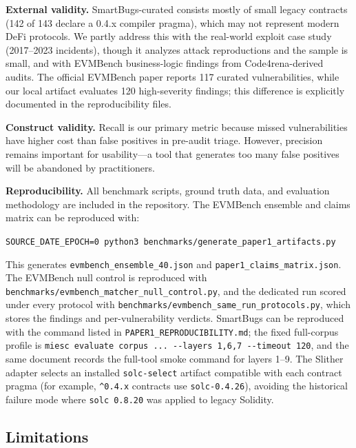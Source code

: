 \documentclass[conference]{IEEEtran}
\begin{document}
\textbf{External validity.} SmartBugs-curated consists mostly of small legacy contracts (142 of 143 declare a 0.4.x compiler pragma), which may not represent modern DeFi protocols. We partly address this with the real-world exploit case study (2017--2023 incidents), though it analyzes attack reproductions and the sample is small, and with EVMBench business-logic findings from Code4rena-derived audits. The official EVMBench paper reports 117 curated vulnerabilities, while our local artifact evaluates 120 high-severity findings; this difference is explicitly documented in the reproducibility files.

\textbf{Construct validity.} Recall is our primary metric because missed vulnerabilities have higher cost than false positives in pre-audit triage. However, precision remains important for usability---a tool that generates too many false positives will be abandoned by practitioners.

\textbf{Reproducibility.} All benchmark scripts, ground truth data, and evaluation methodology are included in the repository. The EVMBench ensemble and claims matrix can be reproduced with:

\smallskip
\noindent\texttt{SOURCE\_DATE\_EPOCH=0 python3 benchmarks/generate\_paper1\_artifacts.py}
\smallskip

This generates \texttt{evmbench\_ensemble\_40.json} and \texttt{paper1\_claims\_matrix.json}. The EVMBench null control is reproduced with \texttt{benchmarks/evmbench\_matcher\_null\_control.py}, and the dedicated run scored under every protocol with \texttt{benchmarks/evmbench\_same\_run\_protocols.py}, which stores the findings and per-vulnerability verdicts. SmartBugs can be reproduced with the command listed in \texttt{PAPER1\_REPRODUCIBILITY.md}; the fixed full-corpus profile is \texttt{miesc evaluate corpus ... -{}-layers 1,6,7 -{}-timeout 120}, and the same document records the full-tool smoke command for layers 1--9. The Slither adapter selects an installed \texttt{solc-select} artifact compatible with each contract pragma (for example, \texttt{\^{}0.4.x} contracts use \texttt{solc-0.4.26}), avoiding the historical failure mode where \texttt{solc 0.8.20} was applied to legacy Solidity.

\subsection{Limitations}
\end{document}
